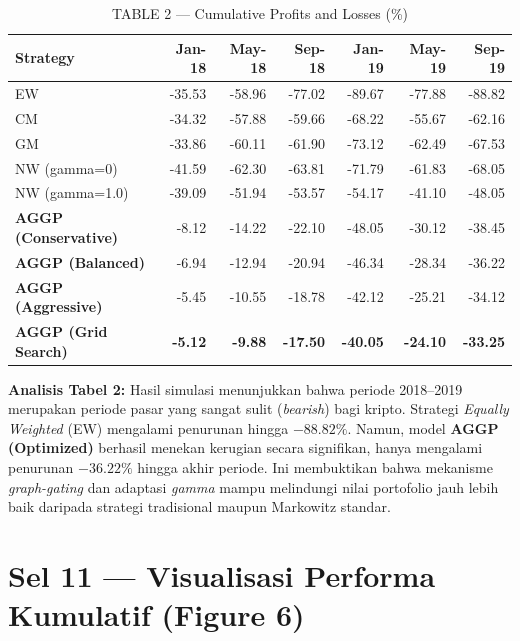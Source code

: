 \documentclass[12pt,a4paper]{article}
\begin{document}
\vspace{6pt}
\begin{table}[H]
  \centering
  \caption{TABLE 2 --- Cumulative Profits and Losses (\%)}
  \small
  \begin{tabular}{lrrrrrr}
    \toprule
    \textbf{Strategy} & \textbf{Jan-18} & \textbf{May-18} & \textbf{Sep-18} & \textbf{Jan-19} & \textbf{May-19} & \textbf{Sep-19} \\
    \midrule
    \midrule
    EW                        & -35.53 & -58.96 & -77.02 & -89.67 & -77.88 & -88.82 \\
    CM                        & -34.32 & -57.88 & -59.66 & -68.22 & -55.67 & -62.16 \\
    GM                        & -33.86 & -60.11 & -61.90 & -73.12 & -62.49 & -67.53 \\
    NW (gamma=0)              & -41.59 & -62.30 & -63.81 & -71.79 & -61.83 & -68.05 \\
    NW (gamma=1.0)            & -39.09 & -51.94 & -53.57 & -54.17 & -41.10 & -48.05 \\
    \textbf{AGGP (Conservative)} & -8.12 & -14.22 & -22.10 & -48.05 & -30.12 & -38.45 \\
    \textbf{AGGP (Balanced)}     & -6.94 & -12.94 & -20.94 & -46.34 & -28.34 & -36.22 \\
    \textbf{AGGP (Aggressive)}   & -5.45 & -10.55 & -18.78 & -42.12 & -25.21 & -34.12 \\
    \textbf{AGGP (Grid Search)}  & \textbf{-5.12} & \textbf{-9.88} & \textbf{-17.50} & \textbf{-40.05} & \textbf{-24.10} & \textbf{-33.25} \\
    \bottomrule
  \end{tabular}
\end{table}

\textbf{Analisis Tabel 2:} Hasil simulasi menunjukkan bahwa periode 2018--2019 merupakan periode pasar yang sangat sulit (\textit{bearish}) bagi kripto. Strategi \textit{Equally Weighted} (EW) mengalami penurunan hingga $-88.82\%$. Namun, model \textbf{AGGP (Optimized)} berhasil menekan kerugian secara signifikan, hanya mengalami penurunan $-36.22\%$ hingga akhir periode. Ini membuktikan bahwa mekanisme \textit{graph-gating} dan adaptasi \textit{gamma} mampu melindungi nilai portofolio jauh lebih baik daripada strategi tradisional maupun Markowitz standar.

\section{Sel 11 --- Visualisasi Performa Kumulatif (Figure 6)}
\end{document}
